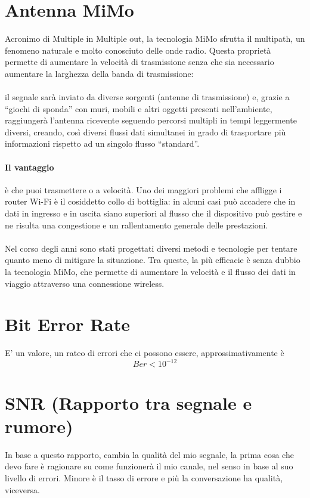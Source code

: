 \documentclass[12pt, a4paper, openany, twoside]{book}
\begin{document}
\section{Antenna MiMo}
Acronimo di Multiple in Multiple out, la tecnologia MiMo sfrutta il multipath, 
un fenomeno naturale e molto conosciuto delle onde radio. Questa proprietà 
permette di aumentare la velocità di trasmissione senza che sia necessario 
aumentare la larghezza della banda di trasmissione: 
\paragraph{}il segnale sarà inviato da 
diverse sorgenti (antenne di trasmissione) e, grazie a “giochi di sponda” con 
muri, mobili e altri oggetti presenti nell'ambiente, raggiungerà l'antenna 
ricevente seguendo percorsi multipli in tempi leggermente diversi, creando, così
diversi flussi dati simultanei in grado di trasportare più informazioni rispetto
ad un singolo flusso “standard”.
\paragraph{Il vantaggio} è che puoi trasmettere o a velocità. Uno dei maggiori
problemi che affligge i router Wi-Fi è il cosiddetto collo di bottiglia: in 
alcuni casi può accadere che in dati in ingresso e in uscita siano superiori al
flusso che il dispositivo può gestire e ne risulta una congestione e un 
rallentamento generale delle prestazioni. 
\paragraph{}Nel corso degli anni sono stati 
progettati diversi metodi e tecnologie per tentare quanto meno di mitigare la 
situazione. Tra queste, la più efficacie è senza dubbio la tecnologia MiMo, 
che permette di aumentare la velocità e il flusso dei dati in viaggio attraverso 
una connessione wireless.
\section{Bit Error Rate}
E' un valore, un rateo di errori che ci possono essere, approssimativamente è 
\[
Ber < 10^{-12}
\]
\section{SNR (Rapporto tra segnale e rumore)}
In base a questo rapporto, cambia la qualità del mio segnale, la prima cosa che
devo fare è ragionare su come funzionerà il mio canale, nel senso in base 
al suo livello di errori. Minore è il tasso di errore e più la conversazione ha
qualità, viceversa.
\end{document}
